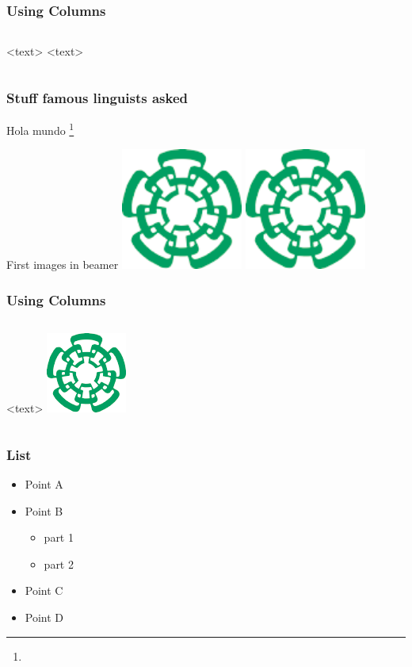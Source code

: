 \documentclass[
	11pt, %
]{beamer}
\newcommand\footcite[1]{\footnote{\bibentry{#1}}\label{\thepage:#1}}
\begin{document}
\begin{frame}
\frametitle{Using Columns}
\begin{columns}
<text>
<text>
\end{columns}
\end{frame}

\begin{frame}
  \frametitle{Stuff famous linguists asked}
  Hola mundo \cite{james} \footcite{james}
  
\end{frame}

\begin{frame}{First images in beamer}
\centering
    \includegraphics[width=4cm,angle=45]{cinvestavlogo}
    \includegraphics[angle=45,width=4cm]{cinvestavlogo}
\end{frame}

\begin{frame}
\frametitle{Using Columns}
\begin{columns}
<text>
\centering
\includegraphics[scale=0.5]{cinvestavlogo}
\end{columns}
\end{frame}

\begin{frame}
\frametitle{List}
\begin{itemize}
\item Point A
\item Point B
\begin{itemize}
\item part 1
\item part 2
\end{itemize}
\item Point C
\item Point D
\end{itemize}
\end{frame}
\end{document}

